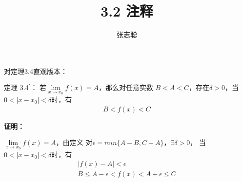 \documentclass{article}
\begin{document}
\title{3.2 注释}
\author{张志聪}
\maketitle

\begin{zremark}
  对定理3.4直观版本：

  定理 3.4$^\prime$： 若$\lim\limits_{x \to x_0} f(x) = A$，那么对任意实数
  $B < A < C$，存在$\delta > 0$，当$0 < |x - x_0| < \delta$时，有
  \begin{align*}
    B < f(x) < C
  \end{align*}
\end{zremark}

\textbf{证明：}

$\lim\limits_{x \to x_0} f(x) = A$，由定义
对$\epsilon = min\{A - B, C - A\}$，$\exists \delta > 0$，
当$0 < |x - x_0| < \delta$时，有
\begin{align*}
  |f(x) - A| < \epsilon \\
  B \leq A - \epsilon < f(x) < A + \epsilon \leq C
\end{align*}
\end{document}
